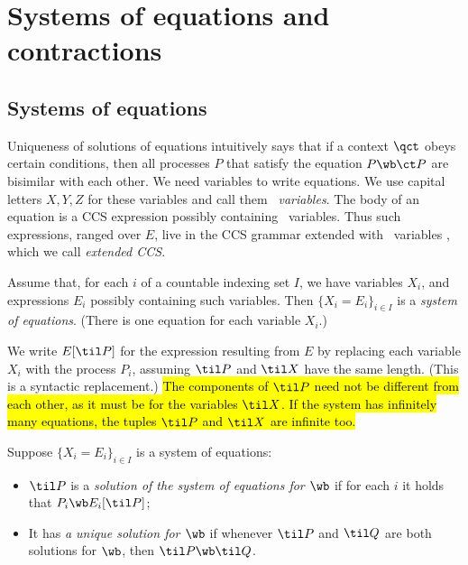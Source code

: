 \section{Systems of equations and contractions}
\label{s:eq}

\subsection{Systems of  equations}
\label{ss:SysEq}

Uniqueness of  solutions of equations \cite{Mil89} intuitively says that if  a context $\qct$ obeys
certain  conditions, 
then all processes $P$  that satisfy the equation $ P \wb \ct P$ are
bisimilar with each other.
We need variables to write equations. We use capital letters $X,Y,Z$
for these variables and call them \emph{\behav\  variables}.
The body of an equation is a CCS expression
possibly containing \behav\  variables. Thus such expressions, ranged
over $E$, live in the CCS grammar extended with \behav\ variables
, which we  call \emph{extended CCS}.

\begin{definition}
Assume that, for each $i$ of 
 a countable indexing set $I$, we have variables $X_i$, and expressions
$E_i$ possibly containing  such variables. 
Then $\{X_i = E_i\}_{i\in I}$ is 
a \emph{system of equations}. (There is one equation for each variable $X_i$.)
\end{definition}

We write $E[\til P]$ for the expression resulting from $E$ by
replacing each variable $X_i$   with the process $P_i$, assuming
$\til P$ and $\til X$ have the same length. (This is a syntactic
replacement.) 
\hl{The components of $\til P$ need not be
different from each other, as it must be for the variables $\til X$.
If the system has infinitely many equations,
the  tuples $\til P$ and $\til X$
are infinite too.}
\begin{definition}
Suppose  $\{  X_i = E_i\}_{i\in I}$ is a system of equations: 
\begin{itemize}
\item
 $\til P$ is a \emph{solution of the 
system of equations  for $\wb$} 
if for each $i$ it holds
that $P_i \wb E_i [\til P]$;

\item It %
 has \emph{a unique solution for $\wb$}  if whenever 
 $\til P$ and $\til Q$ are both solutions for $\wb$, then $\til P \wb
 \til Q$. 
\end{itemize} 
 \end{definition} 

